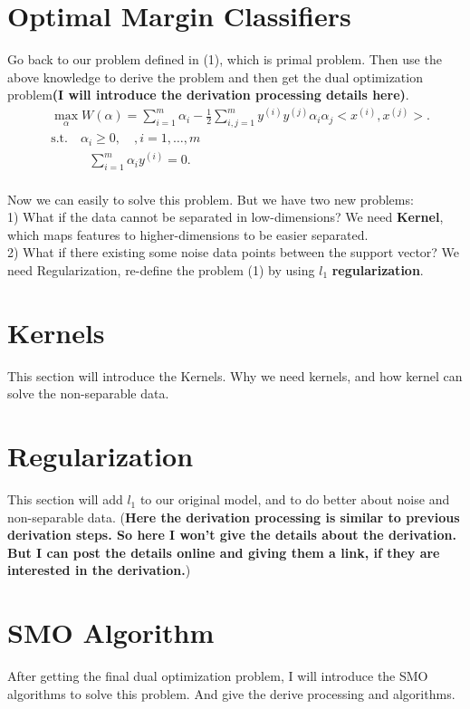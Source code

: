 \documentclass[a4paper]{article}
\begin{document}
\section{Optimal Margin Classifiers}
Go back to our problem defined in (1), which is primal problem. Then use the above knowledge to derive the problem and then get the dual optimization problem\textbf{(I will introduce the derivation processing details here)}.
\begin{align*}
&\max_\alpha W(\alpha) = \sum_{i=1}^{m} \alpha_i - \frac{1}{2} \sum_{i,j=1}^{m} y^{(i)}y^{(j)} \alpha_i \alpha_j <x^{(i)}, x^{(j)}>. \\
&\text{s.t.} \quad \alpha_i \geq 0, \quad, i = 1, \dots, m \\
&\quad \quad \quad \sum_{i=1}^{m} \alpha_i y^{(i)} = 0. 
\end{align*}
\\
Now we can easily to solve this problem. But we have two new problems: \\
1) What if the data cannot be separated in low-dimensions? We need \textbf{Kernel}, which maps features to higher-dimensions to be easier separated.  \\
2) What if there existing some noise data points between the support vector?  We need Regularization, re-define the problem (1) by using $l_1$ \textbf{regularization}. 

\section{Kernels}
This section will introduce the Kernels. Why we need kernels, and how kernel can solve the non-separable data. 

\section{Regularization}
This section will add $l_1$  to our original model, and to do better about noise and non-separable data. (\textbf{Here the derivation processing is similar to previous derivation steps. So here I won't give the details about the derivation. But I can post the details online and giving them a link, if they are interested in the derivation.})

\section{SMO Algorithm}
After getting the final dual optimization problem, I will introduce the SMO algorithms to solve this problem. And give the derive processing and algorithms. 
\end{document}
